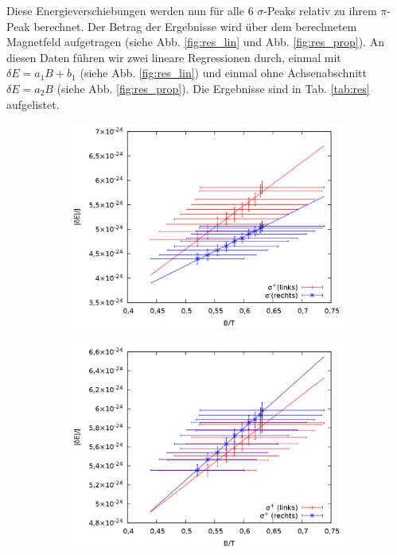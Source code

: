 Diese Energieverschiebungen werden nun für alle 6 $\sigma$-Peaks relativ zu ihrem $\pi$-Peak berechnet. Der Betrag der Ergebnisse wird über dem berechnetem Magnetfeld aufgetragen (siehe Abb. \ref{fig:res_lin} und Abb. \ref{fig:res_prop}). An diesen Daten führen wir zwei lineare Regressionen durch, einmal mit $\delta E = a_1 B + b_1$ (siehe Abb. \ref{fig:res_lin}) und einmal ohne Achsenabschnitt $\delta E = a_2 B$ (siehe Abb. \ref{fig:res_prop}). Die Ergebnisse sind in Tab. \ref{tab:res} aufgelistet.\\
\begin{figure}
\centering
\begin{subfigure}{0.6\textwidth}
\includegraphics[width=\textwidth]{data/zeeman/out_zeeman_neu_links.png}
\end{subfigure}
\begin{subfigure}{0.6\textwidth}
\includegraphics[width=\textwidth]{data/zeeman/out_zeeman_neu_mitte.png}

\end{subfigure}
\end{figure}
